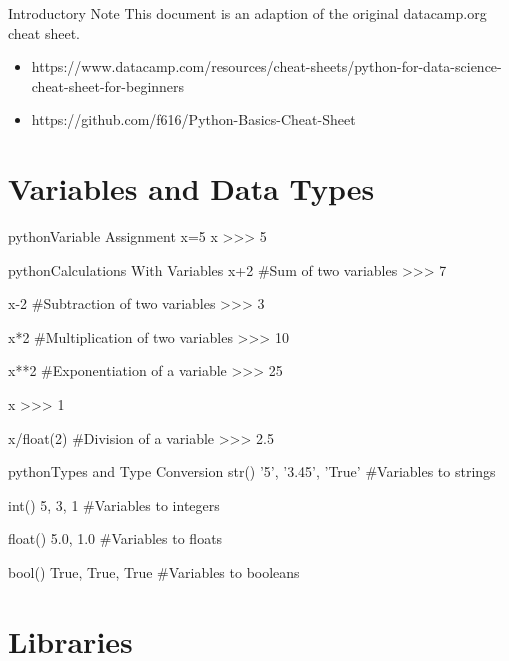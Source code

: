 \begin{alerttextbox}{Introductory Note}
This document is an adaption of the original datacamp.org cheat sheet.\\
\begin{itemize}
    \item {https://www.datacamp.com/resources/cheat-sheets/python-for-data-science-cheat-sheet-for-beginners}
    \item {https://github.com/f616/Python-Basics-Cheat-Sheet}
\end{itemize}

\end{alerttextbox}


\section{Variables and Data Types}

\begin{codebox}{python}{Variable Assignment}
x=5
x
>>> 5
\end{codebox}

\begin{codebox}{python}{Calculations With Variables}
x+2  #Sum of two variables
>>> 7

x-2  #Subtraction of two variables
>>> 3

x*2  #Multiplication of two variables
>>> 10

x**2  #Exponentiation of a variable
>>> 25

x%
>>> 1

x/float(2)  #Division of a variable
>>> 2.5
\end{codebox}

\begin{codebox}{python}{Types and Type Conversion}
str()
'5', '3.45', 'True'  #Variables to strings

int()
5, 3, 1  #Variables to integers

float()
5.0, 1.0  #Variables to floats

bool()
True, True, True  #Variables to booleans
\end{codebox}


\section{Libraries}

